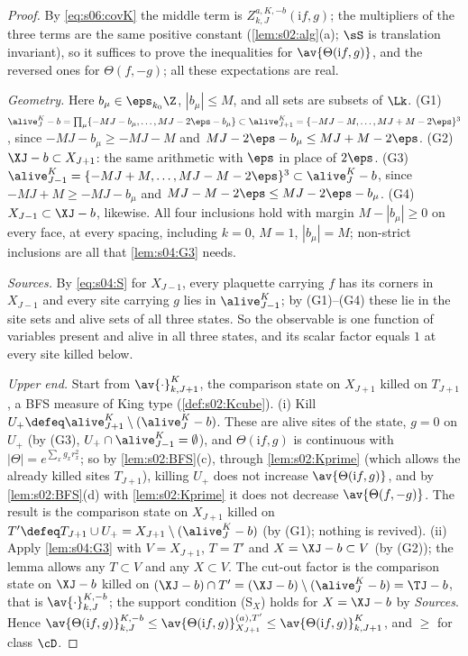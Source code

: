 \begin{proof}
By \eqref{eq:s06:covK} the middle term is $Z^{a,K,-b}_{k,J}(\mathrm if,g)$; the multipliers of the three terms are the same positive constant (\cref{lem:s02:alg}(a); $\sS$ is translation invariant), so it suffices to prove the inequalities for $\av{\Theta(\mathrm if,g)}$, and the reversed ones for $\Theta(f,-g)$; all these expectations are real.

\emph{Geometry.} Here $b_\mu\in\eps_{k_0}\Z$, $|b_\mu|\le M$, and all sets are subsets of $\Lk$. (G1) $\alive^K_J-b=\prod_\mu\{-MJ-b_\mu,\dots,MJ-2\eps-b_\mu\}\subset\alive^K_{J+1}=\{-MJ-M,\dots,MJ+M-2\eps\}^3$, since $-MJ-b_\mu\ge-MJ-M$ and $MJ-2\eps-b_\mu\le MJ+M-2\eps$. (G2) $\XJ-b\subset X_{J+1}$: the same arithmetic with $\eps$ in place of $2\eps$. (G3) $\alive^K_{J-1}=\{-MJ+M,\dots,MJ-M-2\eps\}^3\subset\alive^K_J-b$, since $-MJ+M\ge-MJ-b_\mu$ and $MJ-M-2\eps\le MJ-2\eps-b_\mu$. (G4) $X_{J-1}\subset\XJ-b$, likewise. All four inclusions hold with margin $M-|b_\mu|\ge0$ on every face, at every spacing, including $k=0$, $M=1$, $|b_\mu|=M$; non-strict inclusions are all that \cref{lem:s04:G3} needs.

\emph{Sources.} By \eqref{eq:s04:S} for $X_{J-1}$, every plaquette carrying $f$ has its corners in $X_{J-1}$ and every site carrying $g$ lies in $\alive^K_{J-1}$; by (G1)--(G4) these lie in the site sets and alive sets of all three states. So the observable is one function of variables present and alive in all three states, and its scalar factor equals $1$ at every site killed below.

\emph{Upper end.} Start from $\av{\cdot}^K_{k,J+1}$, the comparison state on $X_{J+1}$ killed on $T_{J+1}$, a BFS measure of King type (\cref{def:s02:Kcube}). (i) Kill $U_+\defeq\alive^K_{J+1}\setminus(\alive^K_J-b)$. These are alive sites of the state, $g=0$ on $U_+$ (by (G3), $U_+\cap\alive^K_{J-1}=\emptyset$), and $\Theta(\mathrm if,g)$ is continuous with $|\Theta|=e^{\sum_xg_xr_x^2}$; so by \cref{lem:s02:BFS}(c), through \cref{lem:s02:Kprime} (which allows the already killed sites $T_{J+1}$), killing $U_+$ does not increase $\av{\Theta(\mathrm if,g)}$, and by \cref{lem:s02:BFS}(d) with \cref{lem:s02:Kprime} it does not decrease $\av{\Theta(f,-g)}$. The result is the comparison state on $X_{J+1}$ killed on $T'\defeq T_{J+1}\cup U_+=X_{J+1}\setminus(\alive^K_J-b)$ (by (G1); nothing is revived). (ii) Apply \cref{lem:s04:G3} with $V=X_{J+1}$, $T=T'$ and $X=\XJ-b\subset V$ (by (G2)); the lemma allows any $T\subset V$ and any $X\subset V$. The cut-out factor is the comparison state on $\XJ-b$ killed on $(\XJ-b)\cap T'=(\XJ-b)\setminus(\alive^K_J-b)=\TJ-b$, that is $\av{\cdot}^{K,-b}_{k,J}$; the support condition (S$_X$) holds for $X=\XJ-b$ by \emph{Sources}. Hence $\av{\Theta(\mathrm if,g)}^{K,-b}_{k,J}\le\av{\Theta(\mathrm if,g)}^{(a),T'}_{X_{J+1}}\le\av{\Theta(\mathrm if,g)}^K_{k,J+1}$, and $\ge$ for class $\cD$.


\end{proof}
